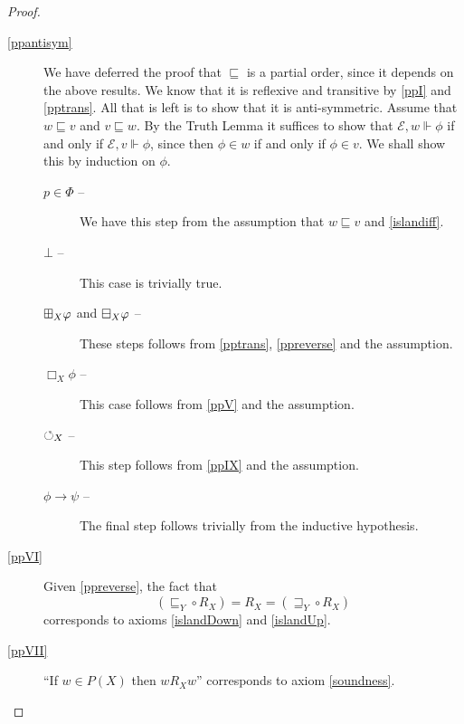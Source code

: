 \begin{proof}
\begin{description}
     \item[\ref{ppantisym}] We have deferred the proof that
      $\sqsubseteq$ is a partial order, since it depends on the above
      results.  We know that it is reflexive and transitive by
      \ref{ppI} and \ref{pptrans}.  All that is left is to show that
      it is anti-symmetric.  Assume that $w \sqsubseteq v$ and $v
      \sqsubseteq w$.  By the Truth Lemma it suffices to show that
      $\mathscr{E}, w \Vdash \phi$ if and only if $\mathscr{E}, v
      \Vdash \phi$, since then $\phi \in w$ if and only if $\phi \in v$.  We shall show this by induction on $\phi$.
      \begin{description}
        \item[$p \in \Phi$ --]  We have this step from the assumption
          that $w \sqsubseteq v$ and \ref{islandiff}.
        \item[$\bot$ --]  This case is trivially true.
        \item[$\boxplus_X \varphi$ and $\boxminus_X\varphi$ --]  These steps follows from
          \ref{pptrans}, \ref{ppreverse} and the assumption.
        \item[$\Box_X \phi$ --]  This case follows from \ref{ppV} and
          the assumption.
        \item[$\circlearrowleft_X$ --] This step follows from \ref{ppIX} and the assumption.
        \item[$\phi \to \psi$ --]  The final step follows trivially from the inductive hypothesis.
      \end{description}





    \item[\ref{ppVI}] Given \ref{ppreverse}, the fact that
    $$(\sqsubseteq_Y \circ R_X) = R_X = (\sqsupseteq_Y \circ R_X)$$
corresponds to axioms \eqref{islandDown} and \eqref{islandUp}.

    \item[\ref{ppVII}] ``If $w \in P (X)$ then $w R_X w$'' corresponds
      to axiom \eqref{soundness}.

  \end{description}

\end{proof}

